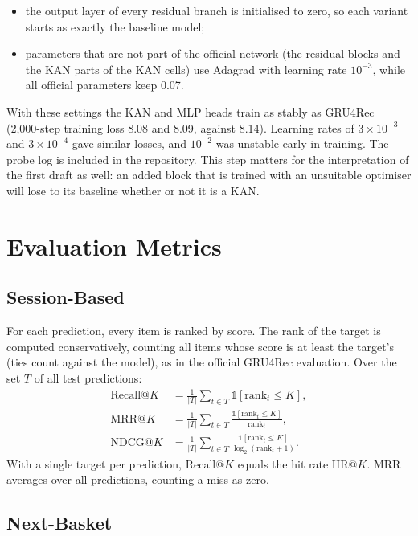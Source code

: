 \documentclass[12pt,a4paper]{report}
\begin{document}
\begin{itemize}
    \item the output layer of every residual branch is initialised to zero, so
          each variant starts as exactly the baseline model;
    \item parameters that are not part of the official network (the residual
          blocks and the KAN parts of the KAN cells) use Adagrad with learning
          rate $10^{-3}$, while all official parameters keep 0.07.
\end{itemize}

With these settings the KAN and MLP heads train as stably as GRU4Rec
(2,000-step training loss 8.08 and 8.09, against 8.14). Learning rates of
$3 \times 10^{-3}$ and $3 \times 10^{-4}$ gave similar losses, and $10^{-2}$ was
unstable early in training. The probe log is included in the repository.
This step matters for the interpretation of the first draft as well: an
added block that is trained with an unsuitable optimiser will lose to its
baseline whether or not it is a KAN.

\section{Evaluation Metrics}

\subsection{Session-Based}

For each prediction, every item is ranked by score. The rank of the target is
computed conservatively, counting all items whose score is at least the target's
(ties count against the model), as in the official GRU4Rec evaluation. Over the
set $T$ of all test predictions:
\begin{align}
\mathrm{Recall@}K &= \frac{1}{|T|} \sum_{t \in T} \mathbb{1}[\mathrm{rank}_t \le K], \\
\mathrm{MRR@}K &= \frac{1}{|T|} \sum_{t \in T} \frac{\mathbb{1}[\mathrm{rank}_t \le K]}{\mathrm{rank}_t}, \\
\mathrm{NDCG@}K &= \frac{1}{|T|} \sum_{t \in T} \frac{\mathbb{1}[\mathrm{rank}_t \le K]}{\log_2(\mathrm{rank}_t + 1)}.
\end{align}
With a single target per prediction, Recall@$K$ equals the hit rate HR@$K$. MRR
averages over all predictions, counting a miss as zero.

\subsection{Next-Basket}
\end{document}
